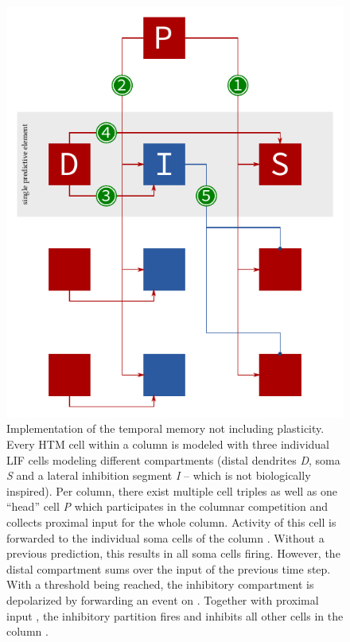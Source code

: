 \begin{figure}
	\begin{center}
		\includegraphics{../circuitry/column.pdf}
	\end{center}
	\caption{Implementation of the temporal memory not including plasticity. Every HTM cell within a column is modeled with three individual LIF cells modeling different compartments (distal dendrites \emph{D}, soma \emph{S} and a lateral inhibition segment \emph{I} -- which is not biologically inspired). Per column, there exist multiple cell triples as well as one ``head'' cell \emph{P} which participates in the columnar competition and collects proximal input for the whole column. Activity of this cell is forwarded to the individual soma cells of the column \protect{}. Without a previous prediction, this results in all soma cells firing. However, the distal compartment sums over the input of the previous time step. With a threshold being reached, the inhibitory compartment is depolarized by forwarding an event on \protect{}. Together with proximal input \protect{}, the inhibitory partition fires and inhibits all other cells in the column \protect{}.}
	\label{fig:static_temporal_memory}
\end{figure}
